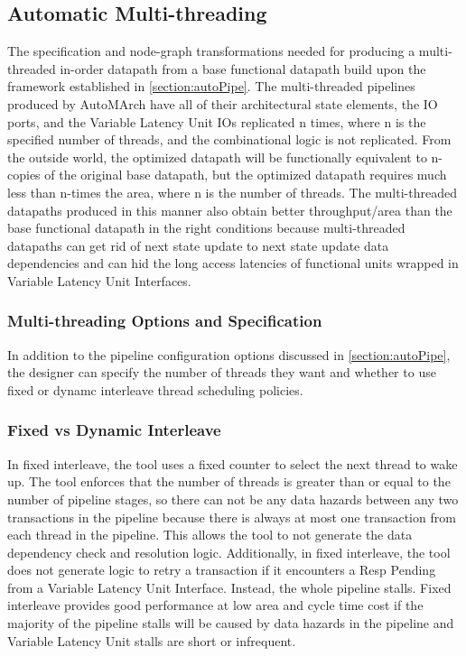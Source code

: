 \subsection{Automatic Multi-threading}
\label{section:autoMult}
The specification and node-graph transformations needed for producing a multi-threaded in-order datapath from a base functional datapath build upon the framework established in \ref{section:autoPipe}. The multi-threaded pipelines produced by AutoMArch have all of their architectural state elements, the IO ports, and the Variable Latency Unit IOs replicated n times, where n is the specified number of threads, and the combinational logic is not replicated. From the outside world, the optimized datapath will be functionally equivalent to n-copies of the original base datapath, but the optimized datapath requires much less than n-times the area, where n is the number of threads. The multi-threaded datapaths produced in this manner also obtain better throughput/area than the base functional datapath in the right conditions because multi-threaded datapaths can get rid of next state update to next state update data dependencies and can hid the long access latencies of functional units wrapped in Variable Latency Unit Interfaces.

\subsubsection{Multi-threading Options and Specification}
In addition to the pipeline configuration options discussed in \ref{section:autoPipe}, the designer can specify the number of threads they want and whether to use fixed or dynamc interleave thread scheduling policies. 

\subsubsection{Fixed vs Dynamic Interleave}
In fixed interleave, the tool uses a fixed counter to select the next thread to wake up. The tool enforces that the number of threads is greater than or equal to the number of pipeline stages, so there can not be any data hazards between any two transactions in the pipeline because there is always at most one transaction from each thread in the pipeline. This allows the tool to not generate the data dependency check and resolution logic. Additionally, in fixed interleave, the tool does not generate logic to retry a transaction if it encounters a Resp Pending from a Variable Latency Unit Interface. Instead, the whole pipeline stalls. Fixed interleave provides good performance at low area and cycle time cost if the majority of the pipeline stalls will be caused by data hazards in the pipeline and Variable Latency Unit stalls are short or infrequent.

